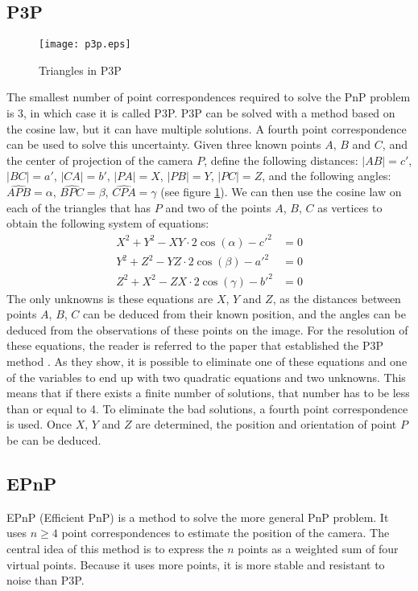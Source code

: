 \subsection{P3P}
\begin{figure}[H]
\centering
\texttt{[image: p3p.eps]}
\caption{Triangles in P3P}
\label{fig:p3p}
\end{figure}
The smallest number of point correspondences required to solve the PnP problem is 3, in which case it is called P3P. P3P can be solved with a method based on the cosine law, but it can have multiple solutions. A fourth point correspondence can be used to solve this uncertainty. Given three known points $A$, $B$ and $C$, and the center of projection of the camera $P$, define the following distances: $|A B| = c'$, $|B C| = a'$, $|C A| = b'$, $|P A| = X$, $|P B| = Y$, $|P C| = Z$, and the following angles: $\widehat{APB} = \alpha$, $\widehat{BPC} = \beta$, $\widehat{CPA} = \gamma$ (see figure \ref{fig:p3p}). We can then use the cosine law on each of the triangles that has $P$ and two of the points $A$, $B$, $C$ as vertices to obtain the following system of equations:
\begin{align}
  X^2 + Y^2 - XY\cdot2\cos(\alpha) - c'^2 &= 0 \\
  Y^2 + Z^2 - YZ\cdot2\cos(\beta)  - a'^2 &= 0 \\
  Z^2 + X^2 - ZX\cdot2\cos(\gamma) - b'^2 &= 0
\end{align}
The only unknowns is these equations are $X$, $Y$ and $Z$, as the distances between points $A$, $B$, $C$ can be deduced from their known position, and the angles can be deduced from the observations of these points on the image. For the resolution of these equations, the reader is referred to the paper that established the P3P method \cite{p3p}. As they show, it is possible to eliminate one of these equations and one of the variables to end up with two quadratic equations and two unknowns. This means that if there exists a finite number of solutions, that number has to be less than or equal to 4. To eliminate the bad solutions, a fourth point correspondence is used. Once $X$, $Y$ and $Z$ are determined, the position and orientation of point $P$ be can be deduced.

\subsection{EPnP}
EPnP (Efficient PnP) \cite{epnp} is a method to solve the more general PnP problem. It uses $n \geq 4$ point correspondences to estimate the position of the camera. The central idea of this method is to express the $n$ points as a weighted sum of four virtual points. Because it uses more points, it is more stable and resistant to noise than P3P.

